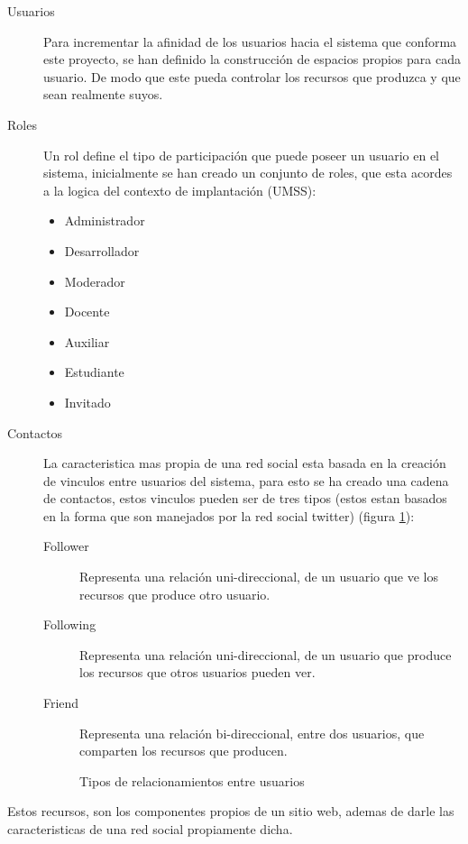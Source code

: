 \begin{description}
\item [Usuarios] Para incrementar la afinidad de los usuarios hacia el sistema
que conforma este proyecto, se han definido la construcción de espacios propios
para cada usuario. De modo que este pueda controlar los recursos que produzca y
que sean realmente suyos.
\item [Roles] Un rol define el tipo de participación que puede poseer un usuario
en el sistema, inicialmente se han creado un conjunto de roles, que esta acordes
a la logica del contexto de implantación (UMSS):
    \begin{itemize}
    \item Administrador
    \item Desarrollador
    \item Moderador
    \item Docente
    \item Auxiliar
    \item Estudiante
    \item Invitado
    \end{itemize}
\item [Contactos] La caracteristica mas propia de una red social esta basada en
la creación de vinculos entre usuarios del sistema, para esto se ha creado una
cadena de contactos, estos vinculos pueden ser de tres tipos (estos estan
basados en la forma que son manejados por la red social twitter) (figura
\ref{contactos}):
    \begin{description}
    \item [Follower] Representa una relación uni-direccional, de un usuario que
    ve los recursos que produce otro usuario.
    \item [Following] Representa una relación uni-direccional, de un usuario que
    produce los recursos que otros usuarios pueden ver.
    \item [Friend] Representa una relación bi-direccional, entre dos usuarios,
    que comparten los recursos que producen.
    \end{description}
    \begin{figure}
    \centering
    
    \caption{Tipos de relacionamientos entre usuarios}
    \label{contactos}
    \end{figure}
\end{description}

Estos recursos, son los componentes propios de un sitio web, ademas de darle las
caracteristicas de una red social propiamente dicha.

